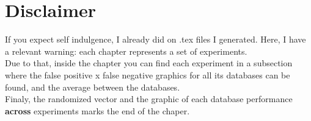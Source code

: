 \chapter{Disclaimer}
\indent If you expect self indulgence, I already did on .tex files I generated. Here, I have a relevant warning: each chapter represents a set of experiments.\\
\indent Due to that, inside the chapter you can find each experiment in a subsection where the false positive x false negative graphics for all its databases can be found, and the average between the databases.\\

\indent Finaly, the randomized vector and the graphic of each database performance \textbf{across} experiments marks the end of the chaper.\\
